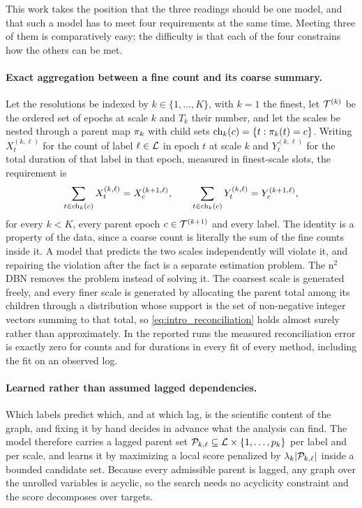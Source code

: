 This work takes the position that the three readings should be one model, and
that such a model has to meet four requirements at the same time. Meeting three
of them is comparatively easy; the difficulty is that each of the four constrains
how the others can be met.

\paragraph{Exact aggregation between a fine count and its coarse summary.}
Let the resolutions be indexed by \(k \in \{1,\dots,K\}\), with \(k=1\) the
finest, let \({\mathcal{T}}^{(k)}\) be the ordered set of epochs at scale \(k\) and
\(T_k\) their number, and let the scales be nested through a parent map
\(\pi_k\) with child sets \(\operatorname{ch}_k(c) = \{t : \pi_k(t) = c\}\). Writing
\(X_t^{(k,\ell)}\) for the count of label \(\ell \in {\mathcal{L}}\) in epoch \(t\) at
scale \(k\) and \(Y_t^{(k,\ell)}\) for the total duration of that label in that
epoch, measured in finest-scale slots, the requirement is
\begin{align}
\sum_{t \in \operatorname{ch}_k(c)} X_t^{(k,\ell)} = X_c^{(k+1,\ell)},
\qquad
\sum_{t \in \operatorname{ch}_k(c)} Y_t^{(k,\ell)} = Y_c^{(k+1,\ell)},
\label{eq:intro_reconciliation}
\end{align}
for every \(k<K\), every parent epoch \(c \in {\mathcal{T}}^{(k+1)}\) and every label. The
identity is a property of the data, since a coarse count is literally the sum of
the fine counts inside it. A model that predicts the two scales independently
will violate it, and repairing the violation after the fact is a separate
estimation problem. The n\(^2\)DBN removes the problem instead of solving it. The
coarsest scale is generated freely, and every finer scale is generated by
allocating the parent total among its children through a distribution whose
support is the set of non-negative integer vectors summing to that total, so
\cref{eq:intro_reconciliation} holds almost surely rather than approximately. In
the reported runs the measured reconciliation error is exactly zero for counts
and for durations in every fit of every method, including the fit on an observed
log.

\paragraph{Learned rather than assumed lagged dependencies.}
Which labels predict which, and at which lag, is the scientific content of the
graph, and fixing it by hand decides in advance what the analysis can find. The
model therefore carries a lagged parent set \({\mathcal{P}}_{k,\ell} \subseteq {\mathcal{L}} \times
\{1,\dots,p_k\}\) per label and per scale, and learns it by maximizing a local
score penalized by \(\lambda_k |{\mathcal{P}}_{k,\ell}|\) inside a bounded candidate set.
Because every admissible parent is lagged, any graph over the unrolled variables
is acyclic, so the search needs no acyclicity constraint and the score decomposes
over targets.


